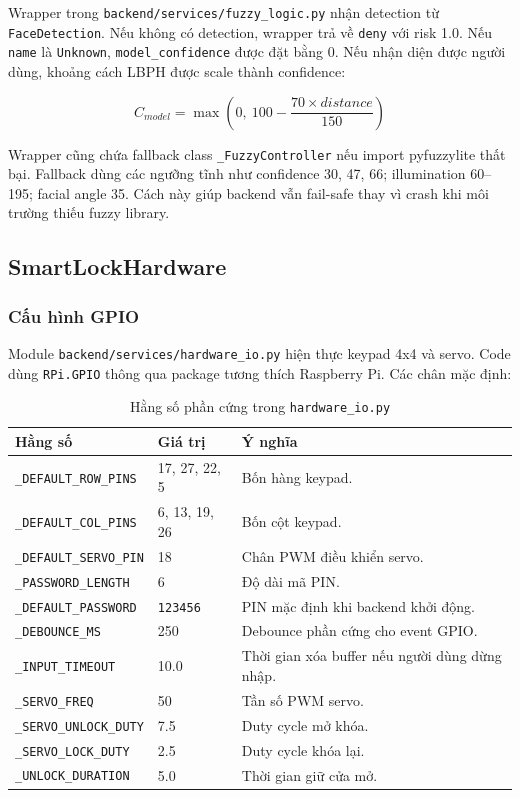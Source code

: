 Wrapper trong \texttt{backend/services/fuzzy\_logic.py} nhận detection từ \texttt{FaceDetection}. Nếu không có detection, wrapper trả về \texttt{deny} với risk 1.0. Nếu \texttt{name} là \texttt{Unknown}, \texttt{model\_confidence} được đặt bằng 0. Nếu nhận diện được người dùng, khoảng cách LBPH được scale thành confidence:

\begin{equation}
    C_{model} = \max\left(0,\ 100 - \frac{70 \times distance}{150}\right)
\end{equation}

Wrapper cũng chứa fallback class \texttt{\_FuzzyController} nếu import pyfuzzylite thất bại. Fallback dùng các ngưỡng tĩnh như confidence 30, 47, 66; illumination 60--195; facial angle 35. Cách này giúp backend vẫn fail-safe thay vì crash khi môi trường thiếu fuzzy library.

\subsection{SmartLockHardware}

\subsubsection{Cấu hình GPIO}

Module \texttt{backend/services/hardware\_io.py} hiện thực keypad 4x4 và servo. Code dùng \texttt{RPi.GPIO} thông qua package tương thích Raspberry Pi. Các chân mặc định:

\begin{table}[H]
\centering
\caption{Hằng số phần cứng trong \texttt{hardware\_io.py}}
\label{tab:hardware_io_constants}
\begin{tabular}{|l|l|l|}
\hline
\textbf{Hằng số} & \textbf{Giá trị} & \textbf{Ý nghĩa} \\
\hline
\texttt{\_DEFAULT\_ROW\_PINS} & 17, 27, 22, 5 & Bốn hàng keypad. \\
\hline
\texttt{\_DEFAULT\_COL\_PINS} & 6, 13, 19, 26 & Bốn cột keypad. \\
\hline
\texttt{\_DEFAULT\_SERVO\_PIN} & 18 & Chân PWM điều khiển servo. \\
\hline
\texttt{\_PASSWORD\_LENGTH} & 6 & Độ dài mã PIN. \\
\hline
\texttt{\_DEFAULT\_PASSWORD} & \texttt{123456} & PIN mặc định khi backend khởi động. \\
\hline
\texttt{\_DEBOUNCE\_MS} & 250 & Debounce phần cứng cho event GPIO. \\
\hline
\texttt{\_INPUT\_TIMEOUT} & 10.0 & Thời gian xóa buffer nếu người dùng dừng nhập. \\
\hline
\texttt{\_SERVO\_FREQ} & 50 & Tần số PWM servo. \\
\hline
\texttt{\_SERVO\_UNLOCK\_DUTY} & 7.5 & Duty cycle mở khóa. \\
\hline
\texttt{\_SERVO\_LOCK\_DUTY} & 2.5 & Duty cycle khóa lại. \\
\hline
\texttt{\_UNLOCK\_DURATION} & 5.0 & Thời gian giữ cửa mở. \\
\hline
\end{tabular}
\end{table}

